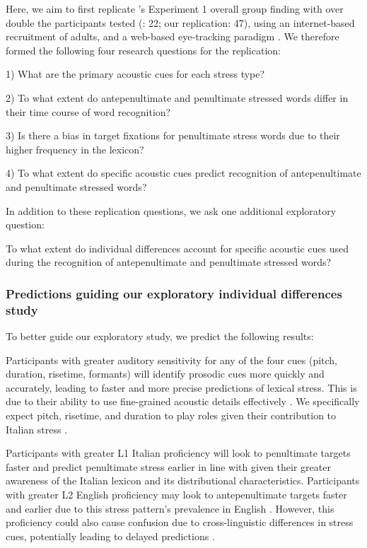 Here, we aim to first replicate \cite{Sulpizio_McQueen_2012}'s Experiment 1 overall group finding with over double the participants tested (\cite{Sulpizio_McQueen_2012}: 22; our replication: 47), using an internet-based recruitment of adults, and a web-based eye-tracking paradigm \citep{Vos_2017}. We therefore formed the following four research questions for the replication:

1) What are the primary acoustic cues for each stress type? 

2) To what extent do antepenultimate and penultimate stressed words differ in their time course of word recognition? 

3) Is there a bias in target fixations for penultimate stress words due to their higher frequency in the lexicon? 

4) To what extent do specific acoustic cues predict recognition of antepenultimate and penultimate stressed words? 

In addition to these replication questions, we ask one additional exploratory question: 

To what extent do individual differences account for specific acoustic cues used during the recognition of antepenultimate and penultimate stressed words?

\subsubsection{Predictions guiding our exploratory individual differences study}
To better guide our exploratory study, we predict the following results: 

Participants with greater auditory sensitivity for any of the four cues (pitch, duration, risetime, formants) will identify prosodic cues more quickly and accurately, leading to faster and more precise predictions of lexical stress. This is due to their ability to use fine-grained acoustic details effectively \citep{nan_2010, goss_2014,mcmurray_2008}. We specifically expect pitch, risetime, and duration to play roles given their contribution to Italian stress \citep{Tagliapietra2005, Alfano2006,Alfano2009,Maturi1998}.

Participants with greater L1 Italian proficiency will look to penultimate targets faster and predict penultimate stress earlier in line with \cite{Sulpizio_McQueen_2012} given their greater awareness of the Italian lexicon and its distributional characteristics. Participants with greater L2 English proficiency may look to antepenultimate targets faster and earlier due to this stress pattern's prevalence in English \citep{cutler2007dutch}. However, this proficiency could also cause confusion due to cross-linguistic differences in stress cues, potentially leading to delayed predictions \citep{primativo2013bilingual}. 

